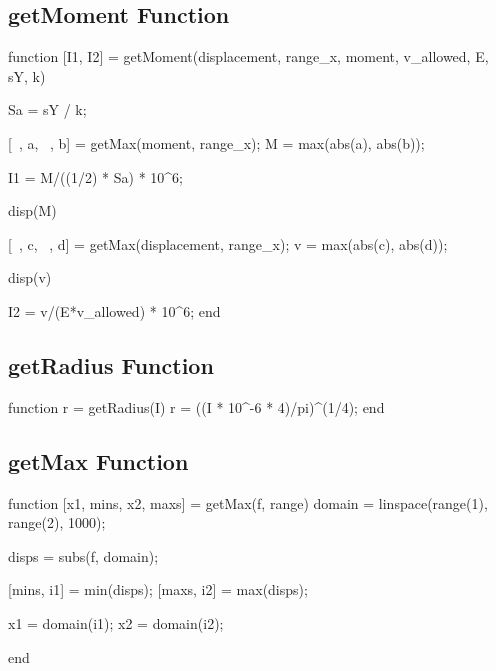 \documentclass[a4paper]{article}
\begin{document}
\subsection{getMoment Function}
\begin{verbatim*}
function [I1, I2] = getMoment(displacement, range_x, moment, v_allowed, E, sY, k)
    
    Sa = sY / k;

    [~, a, ~, b] = getMax(moment, range_x);
    M = max(abs(a), abs(b));
    
    I1 = M/((1/2) * Sa) * 10^6;

    disp(M)

    [~, c, ~, d] = getMax(displacement, range_x);
    v = max(abs(c), abs(d));

    disp(v)

    I2 = v/(E*v_allowed) * 10^6;
end
\end{verbatim*}
\subsection{getRadius Function}
\begin{verbatim*}
function r = getRadius(I)
    r = ((I * 10^-6 * 4)/pi)^(1/4);
end
\end{verbatim*}


\subsection{getMax Function}
\begin{verbatim*}
function [x1, mins, x2, maxs] = getMax(f, range)
    domain = linspace(range(1), range(2), 1000);

    disps = subs(f, domain);

    [mins, i1] = min(disps);
    [maxs, i2] = max(disps);

    x1 = domain(i1);
    x2 = domain(i2);

end
\end{verbatim*}



\end{document}

